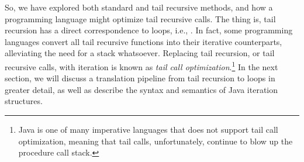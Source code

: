 So, we have explored both standard and tail recursive methods, and how a programming language might optimize tail recursive calls. 
The thing is, tail recursion has a direct correspondence to loops, i.e., . 
In fact, some programming languages convert all tail recursive functions into their iterative counterparts, alleviating the need for a stack whatsoever.
Replacing tail recursion, or tail recursive calls, with iteration is known as \emph{tail call optimization}.\footnote{Java is one of many imperative languages that does not support tail call optimization, meaning that tail calls, unfortunately, continue to blow up the procedure call stack.} 
In the next section, we will discuss a translation pipeline from tail recursion to loops in greater detail, as well as describe the syntax and semantics of Java iteration structures.

  
  
  
  
  
